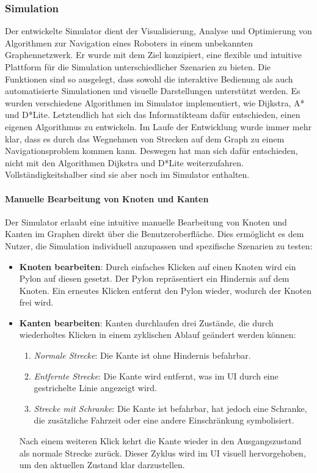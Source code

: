 \documentclass[main.tex]{subfiles} %
\begin{document}
\subsubsection{Simulation}

Der entwickelte Simulator dient der Visualisierung, Analyse und Optimierung von Algorithmen zur Navigation eines Roboters in einem unbekannten Graphennetzwerk. Er wurde mit dem Ziel konzipiert, eine flexible und intuitive Plattform für die Simulation unterschiedlicher Szenarien zu bieten. Die Funktionen sind so ausgelegt, dass sowohl die interaktive Bedienung als auch automatisierte Simulationen und visuelle Darstellungen unterstützt werden.
Es wurden verschiedene Algorithmen im Simulator implementiert, wie Dijkstra, A* und D*Lite.
Letztendlich hat sich das Informatikteam dafür entschieden, einen eigenen Algorithmus zu entwickeln.
Im Laufe der Entwicklung wurde immer mehr klar, dass es durch das Wegnehmen von Strecken auf dem Graph
zu einem Navigationsproblem kommen kann. Deswegen hat man sich dafür entschieden, nicht mit den Algorithmen
Dijkstra und D*Lite weiterzufahren. Vollständigkeitshalber sind sie aber noch im Simulator enthalten.

\paragraph{Manuelle Bearbeitung von Knoten und Kanten}

Der Simulator erlaubt eine intuitive manuelle Bearbeitung von Knoten und Kanten im Graphen direkt über die Benutzeroberfläche. Dies ermöglicht es dem Nutzer, die Simulation individuell anzupassen und spezifische Szenarien zu testen:

\begin{itemize}
    \item \textbf{Knoten bearbeiten}:  
    Durch einfaches Klicken auf einen Knoten wird ein Pylon auf diesen gesetzt. Der Pylon repräsentiert ein Hindernis auf dem Knoten. Ein erneutes Klicken entfernt den Pylon wieder, wodurch der Knoten frei wird.

    \item \textbf{Kanten bearbeiten}:  
    Kanten durchlaufen drei Zustände, die durch wiederholtes Klicken in einem zyklischen Ablauf geändert werden können:
    \begin{enumerate}
        \item \textit{Normale Strecke}: Die Kante ist ohne Hindernis befahrbar.
        \item \textit{Entfernte Strecke}: Die Kante wird entfernt, was im UI durch eine gestrichelte Linie angezeigt wird.
        \item \textit{Strecke mit Schranke}: Die Kante ist befahrbar, hat jedoch eine Schranke, die zusätzliche Fahrzeit oder eine andere Einschränkung symbolisiert.
    \end{enumerate}
    Nach einem weiteren Klick kehrt die Kante wieder in den Ausgangszustand als normale Strecke zurück. Dieser Zyklus wird im UI visuell hervorgehoben, um den aktuellen Zustand klar darzustellen.
\end{itemize}
\end{document}
